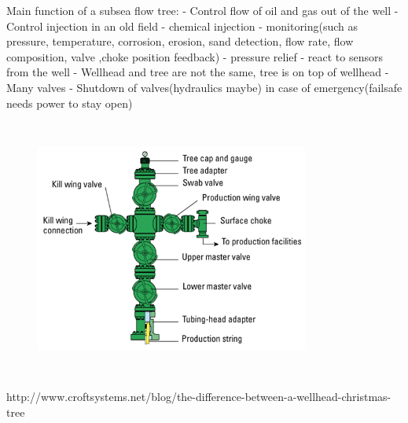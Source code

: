 \documentclass[DIV=calc, paper=a4, fontsize=13pt, twocolumn]{scrartcl}	 %
\begin{document}
Main function of a subsea flow tree:
- Control flow of oil and gas out of the well
- Control injection in an old field
- chemical injection
- monitoring(such as pressure, temperature, corrosion, erosion, sand detection, flow rate, flow composition, valve ,choke position feedback)
- pressure relief
- react to sensors from the well 
- Wellhead and tree are not the same, tree is on top of wellhead
- Many valves
- Shutdown of valves(hydraulics maybe) in case of emergency(failsafe needs power to stay open)
\begin{figure}[h]
\includegraphics[width=9cm,height=8.5cm]{xmas_tree_diagram.png}
\end{figure}




















\newpage
\begin{thebibliography}{99} %


\newblock http://www.croftsystems.net/blog/the-difference-between-a-wellhead-christmas-tree
 
\end{thebibliography}


\end{document}
